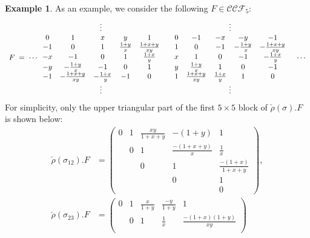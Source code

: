 \documentclass[11pt]{amsart}
\theoremstyle{plain}
\theoremstyle{definition}
\newtheorem{example}[proposition]{Example}
\theoremstyle{remark}
\begin{document}
\begin{example}
As an example, we consider the following $F\in\mathcal{CCF}_5$:
\begin{equation*}
\begin{array}{c@{}ccc@{}c}
& \vdots & \vdots&&\\
F\;=\;\cdots &
\begin{array}{ccccc}
            0 & 1 & x & y & 1 \\
            -1 & 0 & 1 & \frac{1+y}{x} & \frac{1+x+y}{xy} \\
            -x & -1 & 0 & 1 & \frac{1+x}{y} \\
            -y & -\frac{1+y}{x} & -1 & 0 & 1 \\
            -1 & -\frac{1+x+y}{xy} & -\frac{1+x}{y} & -1 & 0
\end{array}&
\begin{array}{ccccc}
            0 & -1 & -x & -y & -1 \\
            1 & 0 & -1 & -\frac{1+y}{x} & -\frac{1+x+y}{xy} \\
            x & 1 & 0 & -1 & -\frac{1+x}{y} \\
            y & \frac{1+y}{x} & 1 & 0 & -1 \\
            1 & \frac{1+x+y}{xy} & \frac{1+x}{y} & 1 & 0
\end{array}&\cdots\\
&\vdots&\vdots&
\end{array}
\end{equation*}
For simplicity, only the upper triangular part of the first $5 \times 5$ block
of $\check{\rho}(\sigma).F$ is shown below:
\begin{align*}
    \check{\rho}(\sigma_{12}).F &= \begin{pmatrix}
            0 & 1 & \frac{xy}{1+x+y} & -(1+y) & 1 \\
            & 0 & 1 & \frac{-(1+x+y)}{x} & \frac{1}{x} \\
            && 0 & 1 & \frac{-(1+x)}{1+x+y} \\
            &&& 0 & 1 \\
            &&&& 0
        \end{pmatrix}, \\
    \check{\rho}(\sigma_{23}).F &= \begin{pmatrix}
            0 & 1 & \frac{x}{1+y} & \frac{-y}{1+y} & 1 \\
            & 0 & 1 & \frac{1}{x} & \frac{-(1+x)(1+y)}{xy} \\

\end{pmatrix}
\end{align*}
\end{example}
\end{document}
